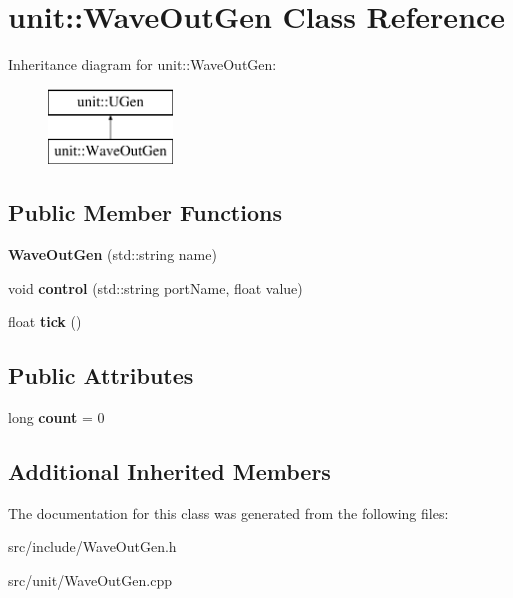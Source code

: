 \hypertarget{classunit_1_1WaveOutGen}{\section{unit\-:\-:Wave\-Out\-Gen Class Reference}
\label{classunit_1_1WaveOutGen}
}
Inheritance diagram for unit\-:\-:Wave\-Out\-Gen\-:\begin{figure}[H]
\begin{center}
\leavevmode
\includegraphics[height=2.000000cm]{classunit_1_1WaveOutGen}
\end{center}
\end{figure}
\subsection*{Public Member Functions}
\begin{DoxyCompactItemize}
\item 
\hypertarget{classunit_1_1WaveOutGen_af7b0343212eb3de1ed4ef2dad90ad43e}{{\bfseries Wave\-Out\-Gen} (std\-::string name)}\label{classunit_1_1WaveOutGen_af7b0343212eb3de1ed4ef2dad90ad43e}

\item 
\hypertarget{classunit_1_1WaveOutGen_a919d71ae0729553b3bd1799add9d1088}{void {\bfseries control} (std\-::string port\-Name, float value)}\label{classunit_1_1WaveOutGen_a919d71ae0729553b3bd1799add9d1088}

\item 
\hypertarget{classunit_1_1WaveOutGen_a468581d97aaf471e6516aee2cdb630cd}{float {\bfseries tick} ()}\label{classunit_1_1WaveOutGen_a468581d97aaf471e6516aee2cdb630cd}

\end{DoxyCompactItemize}
\subsection*{Public Attributes}
\begin{DoxyCompactItemize}
\item 
\hypertarget{classunit_1_1WaveOutGen_ad8ec171f5fa4fabc328b69a2509fde0f}{long {\bfseries count} = 0}\label{classunit_1_1WaveOutGen_ad8ec171f5fa4fabc328b69a2509fde0f}

\end{DoxyCompactItemize}
\subsection*{Additional Inherited Members}


The documentation for this class was generated from the following files\-:\begin{DoxyCompactItemize}
\item 
src/include/Wave\-Out\-Gen.\-h\item 
src/unit/Wave\-Out\-Gen.\-cpp\end{DoxyCompactItemize}
